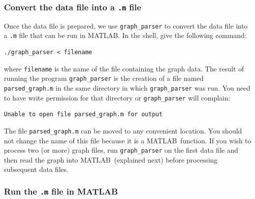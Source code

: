 \documentclass[12pt]{amsart}
\newcommand\matlab{MATLAB}
\begin{document}
\subsubsection*{Convert the data file into a \texttt{.m} file}

Once the data file is prepared, we use \verb|graph_parser| to convert
the data file into a \verb|.m| file that can be run in \matlab. In the
shell, give the following command:
\begin{verbatim}
./graph_parser < filename
\end{verbatim}
where \verb|filename| is the name of the file containing the graph
data. The result of running the program \verb|graph_parser| is the
creation of a file named \verb|parsed_graph.m| in the same directory
in which \verb|graph_parser| was run. You need to have write
permission for that directory or \verb|graph_parser| will complain:
\begin{verbatim}
Unable to open file parsed_graph.m for output
\end{verbatim}

The file \verb|parsed_graph.m| can be moved to any convenient
location. You should not change the name of this file because it is a
\matlab\ function. If you wish to process two (or more) graph files,
run \verb|graph_parser| on the first data file and then read the graph
into \matlab\ (explained next) before processing subsequent data
files.


\subsubsection*{Run the \texttt{.m} file in \matlab}
\end{document}
